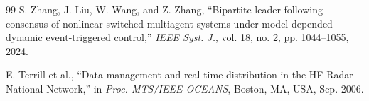 \documentclass[lettersize,journal]{IEEEtran}
\begin{document}
\begin{thebibliography}{99}
 S. Zhang, J. Liu, W. Wang, and Z. Zhang, ``Bipartite
leader-following consensus of nonlinear switched multiagent systems under
model-depended dynamic event-triggered control,'' \textit{IEEE Syst. J.},
vol. 18, no. 2, pp. 1044--1055, 2024.



 E. Terrill et al., ``Data management and real-time distribution
in the HF-Radar National Network,'' in \textit{Proc. MTS/IEEE OCEANS},
Boston, MA, USA, Sep. 2006.

\end{thebibliography}
\end{document}
